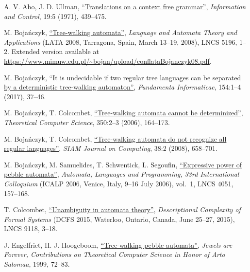 \documentclass[12pt,a4paper]{article}
\theoremstyle{definition}
\begin{document}
\begin{thebibliography}{99}

 A. V. Aho, J. D. Ullman,
	\href{http://dx.doi.org/10.1016/S0019-9958(71)90706-6}
	{``Translations on a context free grammar''},
	\emph{Information and Control},
	19:5 (1971), 439--475.

 M. Boja\'nczyk,
	\href{https://doi.org/10.1007/978-3-540-88282-4_1}
	{``Tree-walking automata''},
	\emph{Language and Automata Theory and Applications}
	(LATA 2008, Tarragona, Spain, March 13--19, 2008),
	LNCS 5196, 1--2.
	Extended version available at \url{https://www.mimuw.edu.pl/~bojan/upload/conflataBojanczyk08.pdf}.
	
 M. Boja\'nczyk,
	\href{https://doi.org/10.3233/FI-2017-1551}
	{``It is undecidable if two regular tree languages can be separated by a deterministic tree-walking automaton''},
	\emph{Fundamenta Informaticae},
	154:1--4 (2017), 37--46.

 M. Boja\'nczyk, T. Colcombet,
	\href{http://dx.doi.org/10.1016/j.tcs.2005.10.031}
	{``Tree-walking automata cannot be determinized''},
	\emph{Theoretical Computer Science},
	350:2--3 (2006), 164--173.
	
 M. Boja\'nczyk, T. Colcombet,
	\href{https://doi.org/10.1137/050645427}
	{``Tree-walking automata do not recognize all regular languages''},
	\emph{SIAM Journal on Computing},
	38:2 (2008), 658--701.
	
 M. Boja\'nczyk, M. Samuelides, T. Schwentick, L. Segoufin,
	\href{http://dx.doi.org/10.1007/11786986_15}
	{``Expressive power of pebble automata''},
	\emph{Automata, Languages and Programming, 33rd International Colloquium}
	(ICALP 2006, Venice, Italy, 9--16 July 2006),
	vol.~1, LNCS 4051, 157--168.

 T. Colcombet,
	\href{https://doi.org/10.1007/978-3-319-19225-3_1}
	{``Unambiguity in automata theory''},
	\emph{Descriptional Complexity of Formal Systems}
	(DCFS 2015, Waterloo, Ontario, Canada, June 25--27, 2015),
	LNCS 9118, 3--18.

 J. Engelfriet, H. J. Hoogeboom,
	\href{https://doi.org/10.1007/978-3-642-60207-8_7}
	{``Tree-walking pebble automata''},
	\emph{Jewels are Forever,
	Contributions on Theoretical Computer Science in Honor of Arto Salomaa},
	1999,
	72--83.


\end{thebibliography}
\end{document}
